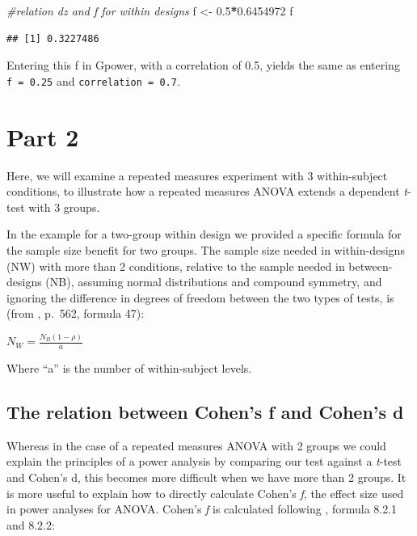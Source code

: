 \documentclass[
]{book}
\newenvironment{Shaded}{\begin{snugshade}}{\end{snugshade}}
\newcommand{\CommentTok}[1]{\textcolor[rgb]{0.56,0.35,0.01}{\textit{#1}}}
\newcommand{\FloatTok}[1]{\textcolor[rgb]{0.00,0.00,0.81}{#1}}
\newcommand{\NormalTok}[1]{#1}
\newcommand{\OperatorTok}[1]{\textcolor[rgb]{0.81,0.36,0.00}{\textbf{#1}}}
\newcommand{\StringTok}[1]{\textcolor[rgb]{0.31,0.60,0.02}{#1}}
\begin{document}
\begin{Shaded}
\begin{Highlighting}[]
\CommentTok{#relation dz and f for within designs }
\NormalTok{f <-}\StringTok{ }\FloatTok{0.5}\OperatorTok{*}\FloatTok{0.6454972}
\NormalTok{f }
\end{Highlighting}
\end{Shaded}

\begin{verbatim}
## [1] 0.3227486
\end{verbatim}

Entering this f in Gpower, with a correlation of 0.5, yields the same as entering \texttt{f\ =\ 0.25} and \texttt{correlation\ =\ 0.7}.

\newpage

\hypertarget{part-2}{%
\section{Part 2}\label{part-2}}

Here, we will examine a repeated measures experiment with 3 within-subject conditions, to illustrate how a repeated measures ANOVA extends a dependent \emph{t}-test with 3 groups.

In the example for a two-group within design we provided a specific formula for the sample size benefit for two groups. The sample size needed in within-designs (NW) with more than 2 conditions, relative to the sample needed in between-designs (NB), assuming normal distributions and compound symmetry, and ignoring the difference in degrees of freedom between the two types of tests, is (from \citet{maxwell_designing_2004}, p.~562, formula 47):

\(N_{W}=\frac{N_{B}(1-\rho)}{a}\)

Where ``a'' is the number of within-subject levels.

\hypertarget{the-relation-between-cohens-f-and-cohens-d}{%
\subsection{The relation between Cohen's f and Cohen's d}\label{the-relation-between-cohens-f-and-cohens-d}}

Whereas in the case of a repeated measures ANOVA with 2 groups we could explain the principles of a power analysis by comparing our test against a \emph{t}-test and Cohen's d, this becomes more difficult when we have more than 2 groups. It is more useful to explain how to directly calculate Cohen's \emph{f}, the effect size used in power analyses for ANOVA. Cohen's \emph{f} is calculated following \citet{cohen1988spa}, formula 8.2.1 and 8.2.2:
\end{document}
